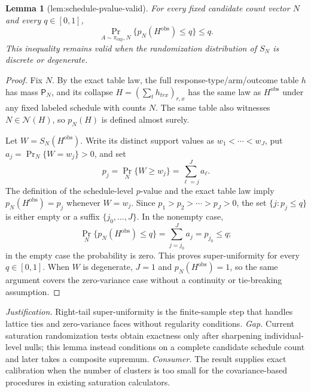 \documentclass{article}
\newtheorem{lemma}{Lemma}
\begin{document}
\begin{lemma}[lem:schedule-pvalue-valid]\label{lem:schedule-pvalue-valid}
For every fixed candidate count vector \(N\) and every \(q\in[0,1]\), \[\Pr_{A\sim\pi_{\exp},N}\{p_N(H^{\mathrm{obs}})\le q\}\le q.\] This inequality remains valid when the randomization distribution of \(S_N\) is discrete or degenerate.
\end{lemma}
\begin{proof}
Fix \(N\).  By the exact table law, the full response-type/arm/outcome table \(h\) has mass \(\mathsf P_N\), and its collapse \(H=(\sum_th_{trx})_{r,x}\) has the same law as \(H^{\mathrm{obs}}\) under any fixed labeled schedule with counts \(N\).  The same table also witnesses \(N\in\mathcal N(H)\), so \(p_N(H)\) is defined almost surely.

Let \(W=S_N(H^{\mathrm{obs}})\).  Write its distinct support values as \(w_1<\cdots<w_J\), put \(a_j=\Pr_N\{W=w_j\}>0\), and set
\[
 p_j=\Pr_N\{W\ge w_j\}=\sum_{\ell=j}^J a_\ell.
\]
The definition of the schedule-level \(p\)-value and the exact table law imply \(p_N(H^{\mathrm{obs}})=p_j\) whenever \(W=w_j\).  Since \(p_1>p_2>\cdots>p_J>0\), the set \(\{j:p_j\le q\}\) is either empty or a suffix \(\{j_0,\ldots,J\}\).  In the nonempty case,
\[
 \Pr_N\{p_N(H^{\mathrm{obs}})\le q\}
 =\sum_{j=j_0}^J a_j=p_{j_0}\le q;
\]
in the empty case the probability is zero.  This proves super-uniformity for every \(q\in[0,1]\).  When \(W\) is degenerate, \(J=1\) and \(p_N(H^{\mathrm{obs}})=1\), so the same argument covers the zero-variance case without a continuity or tie-breaking assumption.
\end{proof}
\par\smallskip\noindent \textit{Justification.} Right-tail super-uniformity is the finite-sample step that handles lattice ties and zero-variance faces without regularity conditions. \textit{Gap.} Current saturation randomization tests obtain exactness only after sharpening individual-level nulls; this lemma instead conditions on a complete candidate schedule count and later takes a composite supremum. \textit{Consumer.} The result supplies exact calibration when the number of clusters is too small for the covariance-based procedures in existing saturation calculators.
\end{document}

